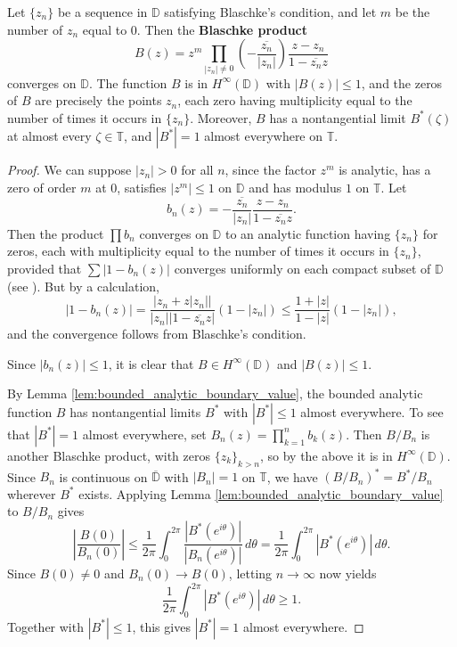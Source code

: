 \begin{theorem}\label{Blaschke product}
Let $\{z_n\}$ be a sequence in $\mathbb{D}$ satisfying Blaschke's condition, and let $m$ be the
number of $z_n$ equal to $0$. Then the \textbf{Blaschke product}
\begin{equation}\label{eq:Blaschke product}
  B(z)=z^m\prod_{|z_n|\neq 0}\left(-\frac{\overline{z_n}}{|z_n|}\right)
  \frac{z-z_n}{1-\overline{z_n}z}
\end{equation}
converges on $\mathbb{D}$. The function $B$ is in $H^\infty(\mathbb{D})$ with $|B(z)|\leq 1$,
and the zeros of $B$ are precisely the points $z_n$, each zero having multiplicity equal to
the number of times it occurs in $\{z_n\}$. Moreover, $B$ has a nontangential limit
$B^*(\zeta)$ at almost every $\zeta\in\mathbb{T}$, and $|B^*|=1$ almost everywhere on
$\mathbb{T}$.
\end{theorem}
\begin{proof}
We can suppose $|z_n|>0$ for all $n$, since the factor $z^m$ is analytic, has a zero of order
$m$ at $0$, satisfies $|z^m|\leq 1$ on $\mathbb{D}$ and has modulus $1$ on $\mathbb{T}$. Let
\begin{equation*}
  b_n(z)=-\frac{\overline{z_n}}{|z_n|}\frac{z-z_n}{1-\overline{z_n}z}.
\end{equation*}
Then the product $\prod b_n$ converges on $\mathbb{D}$ to an analytic function having
$\{z_n\}$ for zeros, each with multiplicity equal to the number of times it occurs in
$\{z_n\}$, provided that $\sum|1-b_n(z)|$ converges uniformly on each compact subset of
$\mathbb{D}$ (see \cite[Chapter 15]{rudin1974real}). But by a calculation,
\begin{equation*}
  |1-b_n(z)|=\frac{|z_n+z|z_n||}{|z_n||1-\overline{z_n}z|}(1-|z_n|)
  \leq\frac{1+|z|}{1-|z|}(1-|z_n|),
\end{equation*}
and the convergence follows from Blaschke's condition.

Since $|b_n(z)|\leq 1$, it is clear that $B\in H^\infty(\mathbb{D})$ and $|B(z)|\leq 1$.

By Lemma \ref{lem:bounded_analytic_boundary_value}, the bounded analytic function $B$ has
nontangential limits $B^*$ with $|B^*|\leq 1$ almost everywhere. To see that $|B^*|=1$
almost everywhere, set $B_n(z)=\prod_{k=1}^n b_k(z)$. Then $B/B_n$ is another Blaschke
product, with zeros $\{z_k\}_{k>n}$, so by the above it is in $H^\infty(\mathbb{D})$. Since
$B_n$ is continuous on $\overline{\mathbb{D}}$ with $|B_n|=1$ on $\mathbb{T}$, we have
$(B/B_n)^*=B^*/B_n$ wherever $B^*$ exists. Applying
Lemma \ref{lem:bounded_analytic_boundary_value} to $B/B_n$ gives
\begin{equation*}
  \left|\frac{B(0)}{B_n(0)}\right|
  \leq\frac{1}{2\pi}\int_0^{2\pi}\frac{|B^*(e^{i\theta})|}{|B_n(e^{i\theta})|}\,d\theta
  =\frac{1}{2\pi}\int_0^{2\pi}|B^*(e^{i\theta})|\,d\theta.
\end{equation*}
Since $B(0)\neq 0$ and $B_n(0)\rightarrow B(0)$, letting $n\rightarrow\infty$ now yields
\begin{equation*}
  \frac{1}{2\pi}\int_0^{2\pi}|B^*(e^{i\theta})|\,d\theta\geq 1.
\end{equation*}
Together with $|B^*|\leq 1$, this gives $|B^*|=1$ almost everywhere.
\end{proof}

